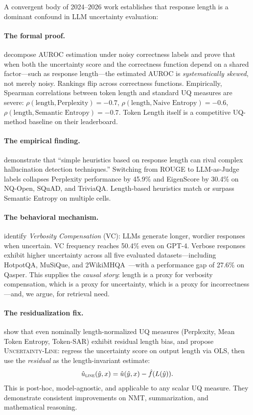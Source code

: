 \documentclass[11pt]{article}
\begin{document}
A convergent body of 2024--2026 work establishes that response
length is a dominant confound in LLM uncertainty evaluation:

\paragraph{The formal proof.}
\cite{Santilli_RevisitingUQEvaluationLengthBias} decompose AUROC
estimation under noisy correctness labels and prove that when both the
uncertainty score and the correctness function depend on a shared
factor---such as response length---the estimated AUROC is
\emph{systematically skewed}, not merely noisy. Rankings flip across
correctness functions. Empirically, Spearman correlations between
token length and standard UQ measures are severe:
$\rho(\text{length}, \text{Perplexity}) = -0.7$,
$\rho(\text{length}, \text{Naive Entropy}) = -0.6$,
$\rho(\text{length}, \text{Semantic Entropy}) = -0.7$.
Token Length itself is a competitive UQ-method baseline on their
leaderboard.

\paragraph{The empirical finding.}
\cite{Janiak_IllusionProgressHallucinationDetection} demonstrate that
``simple heuristics based on response length can rival complex
hallucination detection techniques.'' Switching from ROUGE to
LLM-as-Judge labels collapses Perplexity performance by 45.9\% and
EigenScore by 30.4\% on NQ-Open, SQuAD, and TriviaQA. Length-based
heuristics match or surpass Semantic Entropy on multiple cells.

\paragraph{The behavioral mechanism.}
\cite{Zhang_VerbosityVeracityVCBehavior} identify \emph{Verbosity
Compensation} (VC): LLMs generate longer, wordier responses when
uncertain. VC frequency reaches 50.4\% even on GPT-4. Verbose
responses exhibit higher uncertainty across all five evaluated
datasets---including HotpotQA, MuSiQue, and
2WikiMHQA~\citep{Zhang_VerbosityVeracityVCBehavior}---with a
performance gap of 27.6\% on Qasper. This supplies the \emph{causal
story}: length is a proxy for verbosity compensation, which is a
proxy for uncertainty, which is a proxy for
incorrectness---and, we argue, for retrieval need.

\paragraph{The residualization fix.}
\cite{Vashurin_UncertaintyLineLengthInvariant} show that even
nominally length-normalized UQ measures (Perplexity, Mean Token
Entropy, Token-SAR) exhibit residual length bias, and propose
\textsc{Uncertainty-Line}: regress the uncertainty score on output
length via OLS, then use the \emph{residual} as the length-invariant
estimate:
\[
\hat{u}_{\textsc{line}}(\hat{y}, x)
= \hat{u}(\hat{y}, x) - \hat{f}(L(\hat{y})).
\]
This is post-hoc, model-agnostic, and applicable to any scalar UQ
measure. They demonstrate consistent improvements on NMT,
summarization, and mathematical reasoning.
\end{document}
